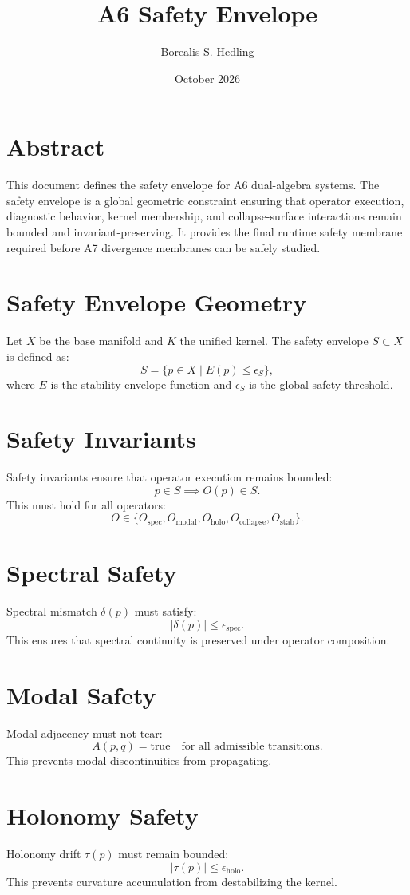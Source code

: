 \documentclass[11pt]{article}
\title{A6 Safety Envelope}
\author{Borealis S. Hedling}
\date{October 2026}
\begin{document}
\maketitle

\section*{Abstract}
This document defines the safety envelope for A6 dual-algebra systems. The
safety envelope is a global geometric constraint ensuring that operator
execution, diagnostic behavior, kernel membership, and collapse-surface
interactions remain bounded and invariant-preserving. It provides the final
runtime safety membrane required before A7 divergence membranes can be safely
studied.

\section{Safety Envelope Geometry}
Let $X$ be the base manifold and $K$ the unified kernel. The safety envelope
$S \subset X$ is defined as:
\[
S = \{ p \in X \mid E(p) \leq \epsilon_S \},
\]
where $E$ is the stability-envelope function and $\epsilon_S$ is the global
safety threshold.

\section{Safety Invariants}
Safety invariants ensure that operator execution remains bounded:
\[
p \in S \implies O(p) \in S.
\]
This must hold for all operators:
\[
O \in \{ O_{\text{spec}}, O_{\text{modal}}, O_{\text{holo}},
         O_{\text{collapse}}, O_{\text{stab}} \}.
\]

\section{Spectral Safety}
Spectral mismatch $\delta(p)$ must satisfy:
\[
|\delta(p)| \leq \epsilon_{\text{spec}}.
\]
This ensures that spectral continuity is preserved under operator composition.

\section{Modal Safety}
Modal adjacency must not tear:
\[
A(p,q) = \text{true} \quad \text{for all admissible transitions}.
\]
This prevents modal discontinuities from propagating.

\section{Holonomy Safety}
Holonomy drift $\tau(p)$ must remain bounded:
\[
|\tau(p)| \leq \epsilon_{\text{holo}}.
\]
This prevents curvature accumulation from destabilizing the kernel.
\end{document}
